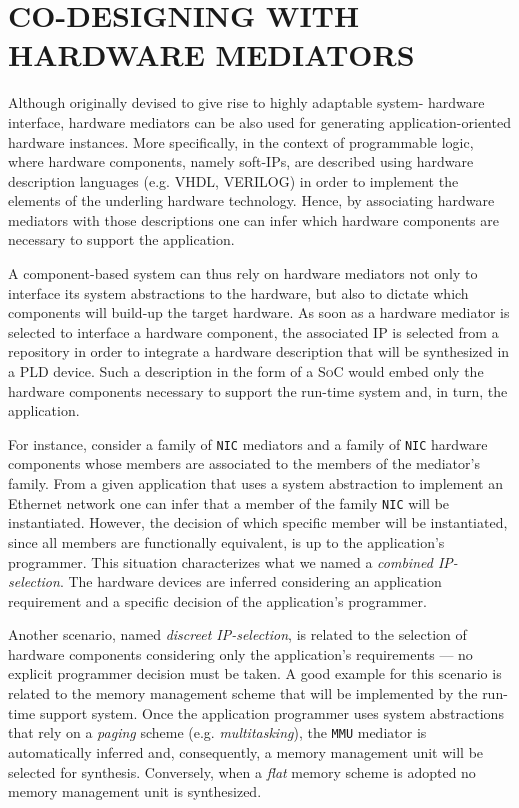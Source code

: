 \documentclass{kapproc} %
\begin{document}
\section[CO-DESIGNING WITH HARDWARE MEDIATORS]
{CO-DESIGNING WITH HARDWARE MEDIATORS\label{medcodesign}}

 Although originally devised to give rise to highly adaptable
 system- hardware interface, hardware mediators can be also used for
 generating application-oriented hardware instances. More
 specifically, in the context of programmable logic, where hardware
 components, namely soft-IPs, are described using hardware description
 languages (e.g. VHDL, VERILOG) in order to implement the elements of
 the underling hardware technology. Hence, by associating hardware
 mediators with those descriptions one can infer which hardware
 components are necessary to support the application.

 A component-based system can thus rely on hardware mediators not only
 to interface its system abstractions to the hardware, but also to
 dictate which components will build-up the target hardware. As soon
 as a hardware mediator is selected to interface a hardware component,
 the associated \textsc{IP} is selected from a repository in order to
 integrate a hardware description that will be synthesized in a
 \textsc{PLD} device. Such a description in the form of a \textsc{SoC}
 would embed only the hardware components necessary to support the
 run-time system and, in turn, the application.

 For instance, consider a family of \texttt{NIC} mediators and a
 family of \texttt{NIC} hardware components whose members are
 associated to the members of the mediator's family. From a given
 application that uses a system abstraction to implement an Ethernet
 network one can infer that a member of the family \texttt{NIC} will
 be instantiated. However, the decision of which specific member will
 be instantiated, since all members are functionally equivalent, is up
 to the application's programmer. This situation characterizes what we
 named a \emph{combined IP-selection}. The hardware devices are
 inferred considering an application requirement and a specific
 decision of the application's programmer.

 Another scenario, named \emph{discreet IP-selection}, is related to
 the selection of hardware components considering only the
 application's requirements --- no explicit programmer decision must
 be taken. A good example for this scenario is related to the memory
 management scheme that will be implemented by the run-time support
 system. Once the application programmer uses system abstractions that
 rely on a \emph{paging} scheme (e.g. \emph{multitasking}), the
 \texttt{MMU} mediator is automatically inferred and, consequently, a
 memory management unit will be selected for synthesis. Conversely,
 when a \emph{flat} memory scheme is adopted no memory management unit
 is synthesized.
\end{document}
